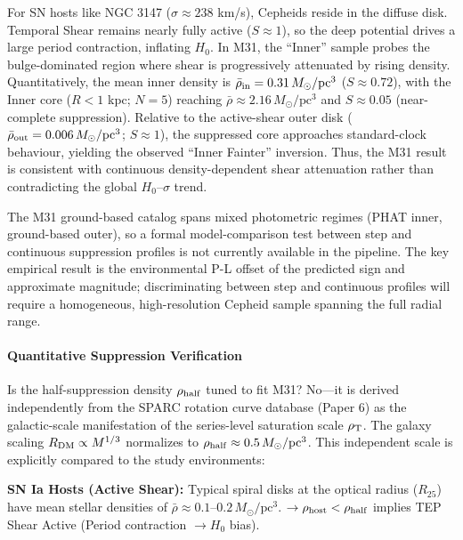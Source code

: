 \documentclass[
]{article}
\begin{document}
For SN hosts like NGC 3147 (\(\sigma \approx 238\) km/s), Cepheids
reside in the diffuse disk. Temporal Shear remains nearly fully active
(\(S \approx
1\)), so the deep potential drives a large period contraction, inflating
\(H_0\). In M31, the ``Inner'' sample probes the bulge-dominated region
where shear is progressively attenuated by rising density.
Quantitatively, the mean inner density is
\(\bar{\rho}_{\rm in}=0.31\,M_\odot/\mathrm{pc}^3\) (\(S
\approx 0.72\)), with the Inner core (\(R<1\) kpc; \(N=5\)) reaching
\(\bar{\rho}\approx 2.16\,M_\odot/\text{pc}^3\) and \(S \approx 0.05\)
(near-complete suppression). Relative to the active-shear outer disk
(\(\bar{\rho}_{\rm out}=0.006\,M_\odot/\text{pc}^3\); \(S \approx 1\)),
the suppressed core approaches standard-clock behaviour, yielding the
observed ``Inner Fainter'' inversion. Thus, the M31 result is consistent
with continuous density-dependent shear attenuation rather than
contradicting the global \(H_0\)--\(\sigma\) trend.

The M31 ground-based catalog spans mixed photometric regimes (PHAT
inner, ground-based outer), so a formal model-comparison test between
step and continuous suppression profiles is not currently available in
the pipeline. The key empirical result is the environmental P-L offset
of the predicted sign and approximate magnitude; discriminating between
step and continuous profiles will require a homogeneous, high-resolution
Cepheid sample spanning the full radial range.

\paragraph{Quantitative Suppression
Verification}\label{quantitative-suppression-verification}

Is the half-suppression density \(\rho_{\rm half}\) tuned to fit M31?
No---it is derived independently from the SPARC rotation curve database
(Paper 6) as the galactic-scale manifestation of the series-level
saturation scale \(\rho_{\rm T}\). The galaxy scaling
\(R_{\rm DM} \propto M^{1/3}\) normalizes to \(\rho_{\rm half}
\approx 0.5\,M_\odot/\text{pc}^3\). This independent scale is explicitly
compared to the study environments:

\textbf{SN Ia Hosts (Active Shear):} Typical spiral disks at the optical
radius (\(R_{25}\)) have mean stellar densities of \(\bar{\rho} \approx
0.1\text{--}0.2\,M_\odot/\text{pc}^3\). \(\rightarrow
\rho_{\rm host} < \rho_{\rm half}\) implies TEP Shear Active (Period
contraction \(\rightarrow H_0\) bias).
\end{document}
